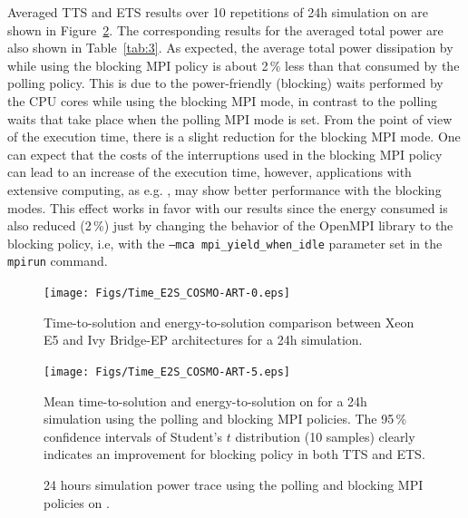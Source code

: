 Averaged TTS and ETS results over 10 repetitions of 24h simulation on \tinto are shown in Figure~\ref{fig:4}. The corresponding results for the averaged total power are also shown in Table~\ref{tab:3}.  
As expected, the average total power dissipation by \cosmoart while using the blocking MPI policy is about 2\,\% less than that consumed by the polling policy. This is due to the power-friendly (blocking) waits performed by the CPU cores while using the blocking MPI mode, in contrast to the polling waits that take place when the polling MPI mode is set. From the point of view of the execution time, there is a slight reduction for the blocking MPI mode. One can expect that the costs of the interruptions used in the blocking MPI policy can lead to an increase of the execution time, however, applications with extensive computing, as e.g. \cosmoart, may show better performance with the blocking modes. This effect works in favor with our results since the energy consumed is also reduced (2\,\%) just by changing the behavior of the OpenMPI library to the blocking policy, i.e, with the \texttt{--mca mpi\_yield\_when\_idle} parameter set in the \texttt{mpirun} command.

\begin{figure}[htbf]
  \centering
  \texttt{[image: Figs/Time\_E2S\_COSMO-ART-0.eps]}
  \caption{Time-to-solution and energy-to-solution comparison between
    Xeon E5 and Ivy Bridge-EP architectures for a 24h simulation.}
  \label{fig:3}
\end{figure}

\begin{figure}[htbf]

  \centering
  \texttt{[image: Figs/Time\_E2S\_COSMO-ART-5.eps]}
  \vspace{-1cm}
  \caption{Mean time-to-solution and energy-to-solution on
    \tinto for a 24h simulation using the polling and blocking MPI policies. The 95\,\% confidence intervals of Student's $t$ distribution (10 samples) clearly indicates 
    an improvement for blocking policy in both TTS and ETS.}
  \label{fig:4}
\end{figure}

\begin{figure}[ht]
  \centering
  \hspace{0.8cm}
  \scalebox{0.62}{}
  \caption{24 hours simulation power trace using the polling and blocking MPI policies on \tinto.}
  \label{fig:9}
\end{figure}

